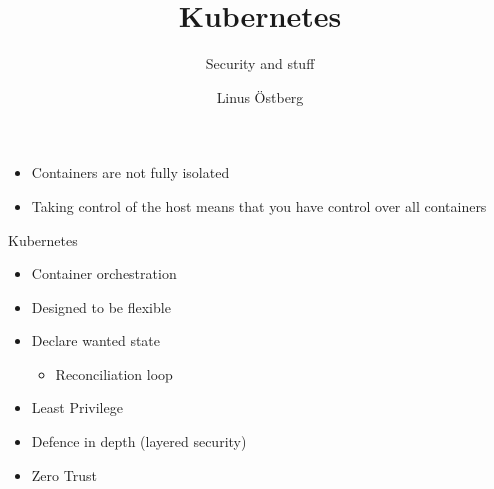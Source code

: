 \documentclass{dcpresentation}
\title{Kubernetes}
\subtitle{Security and stuff}
\author{Linus Östberg}
\institute{SciLifeLab Data Centre}
\date{}
\begin{document}
 \begin{frame}
  \maketitle
 \end{frame}

\begin{frame}
\end{frame}

\begin{frame}
\end{frame}



\begin{frame}
 \begin{itemize}
  \item Containers are not fully isolated
  \item Taking control of the host means that you have control over all containers
 \end{itemize}
\end{frame}

\begin{frame}{Kubernetes}
 \begin{itemize}
  \item Container orchestration
  \item Designed to be flexible
  \item Declare wanted state
  \begin{itemize}
   \item Reconciliation loop
  \end{itemize}
 \end{itemize}
\end{frame}


\begin{frame}
 \begin{itemize}
  \item Least Privilege
  \item Defence in depth (layered security)
  \item Zero Trust
 \end{itemize}
\end{frame}
\end{document}
